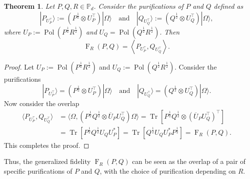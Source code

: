 \documentclass[12pt]{article}
\newtheorem{theorem}{Theorem}[section] %
\theoremstyle{definition}
\begin{document}
\begin{theorembox}
    \begin{theorem}
Let $P, Q, R \in \mathbb P_d$. Consider the purifications of $P$ and $Q$ defined as
\begin{equation}
|P_{U_P^\top}\rangle := \left(P^{\frac12}   \otimes U_P^\top\right) |\Omega \rangle \quad \text{and} \quad |Q_{U_Q^\top}\rangle := \left(Q^{\frac12}  \otimes U_Q^\top\right) |\Omega \rangle ,
\end{equation}
where $U_P := \operatorname{Pol}\left(P^{\frac 12} R^{\frac 12}\right)$ and $U_Q = \operatorname{Pol}\left(Q^{\frac 12} R^{\frac 12}\right)$. Then
\begin{equation}
\operatorname{F}_R(P,Q) = \left\langle P_{U_P^\top}, Q_{U_Q^\top}\right \rangle.
\end{equation}
\end{theorem}
\end{theorembox}

\begin{proof}
Let $U_P := \operatorname{Pol}\left(P^{\frac 12} R^{\frac 12}\right)$ and $U_Q := \operatorname{Pol}\left(Q^{\frac 12} R^{\frac 12}\right)$. Consider the purifications
\begin{equation}
|P_{U_P^\top}\rangle = \left(P^{\frac12}   \otimes U_P^\top\right) |\Omega \rangle \quad \text{and} \quad |Q_{U_Q^\top}\rangle = \left(Q^{\frac12}  \otimes U_Q^\top\right) |\Omega \rangle .
\end{equation}
Now consider the overlap
\begin{equation}
\begin{aligned}
    \langle P_{U_P^\top}, Q_{U_Q^\top} \rangle &= \langle \Omega , \left(P^{\frac12}   Q^{\frac12}  \otimes \overline{U}_P U_Q^\top \right) \Omega \rangle = \operatorname{Tr}\left[P^{\frac12}   Q^{\frac12}  \otimes  \left(\overline{U}_P U_Q^\top\right)^\top\right] 
    \\ &= \operatorname{Tr}\left[P^{\frac12}   Q^{\frac12}  U_Q U_P^*\right]  = \operatorname{Tr}\left[Q^{\frac12}  U_Q U_P^* P^{\frac12} \right] = \operatorname{F}_R(P,Q).
\end{aligned}
\end{equation}
This completes the proof.
\end{proof}

Thus, the generalized fidelity $\operatorname{F}_R(P,Q) $ can be seen as the overlap of a pair of specific purifications of $P$ and $Q$, with the choice of purification depending on $R$.
\end{document}
